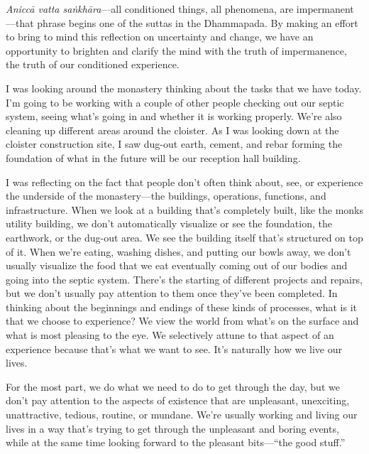 \emph{Aniccā vatta saṅkhāra}---all conditioned things, all 
phenomena, are impermanent---that phrase begins one of the suttas in 
the Dhammapada. By making an effort to bring to mind this reflection on 
uncertainty and change, we have an opportunity to brighten and clarify 
the mind with the truth of impermanence, the truth of our conditioned 
experience.


I was looking around the monastery thinking about the tasks that we 
have today. I'm going to be working with a couple of other people 
checking out our septic system, seeing what's going in and whether it 
is working properly. We're also cleaning up different areas around the 
cloister. As I was looking down at the cloister construction site, I 
saw dug-out earth, cement, and rebar forming the foundation of what in 
the future will be our reception hall building.

I was reflecting on the fact that people don't often think about, see, 
or experience the underside of the monastery---the buildings, 
operations, functions, and infrastructure. When we look at a building 
that's completely built, like the monks utility building, we don't 
automatically visualize or see the foundation, the earthwork, or the 
dug-out area. We see the building itself that's structured on top of 
it. When we're eating, washing dishes, and putting our bowls away, we 
don't usually visualize the food that we eat eventually coming out of 
our bodies and going into the septic system. There's the starting of 
different projects and repairs, but we don't usually pay attention to 
them once they've been completed. In thinking about the beginnings and 
endings of these kinds of processes, what is it that we choose to 
experience? We view the world from what's on the surface and what is 
most pleasing to the eye. We selectively attune to that aspect of an 
experience because that's what we want to see. It's naturally how we 
live our lives.

For the most part, we do what we need to do to get through the day, but 
we don't pay attention to the aspects of existence that are unpleasant, 
unexciting, unattractive, tedious, routine, or mundane. We're usually 
working and living our lives in a way that's trying to get through the 
unpleasant and boring events, while at the same time looking forward to 
the pleasant bits---``the good stuff.''

